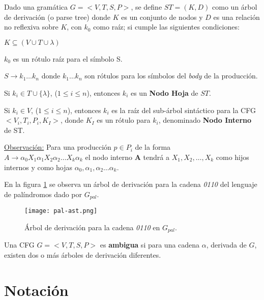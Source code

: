 \begin{definition}
\label{def:arbolderivacion}
Dado una gramática $G = < V,T,S,P>$, se define $ST = (K,D)$ como un árbol de derivación (o parse tree) donde $K$ es un conjunto de nodos y $D$ es una relación no reflexiva sobre $K$, con $k_0$ como raíz; si cumple las siguientes condiciones:

\begin{items}
\item $ K \subseteq (V \cup T \cup \lambda) $
\item $k_{0}$ es un rótulo raíz para el símbolo S.
\item $ S \rightarrow k_{1} \ldots k_{n} $ donde $k_{1} \ldots k_{n}$ son rótulos para los símbolos del \textit{body} de la producción.
\item Si $k_{i} \in T \cup \{\lambda\}$, ($1 \leq i \leq n$), entonces $k_{i}$ es un \textbf{Nodo Hoja} de $ST$. 
\item Si $k_{i} \in V$,  ($1 \leq i \leq n$), entonces $k_{i}$ es la raíz del 
      sub-árbol sintáctico para la CFG $<V_{i},T_{i},P_{i},K_I>$, donde $K_{I}$ es un rótulo para $k_{i}$, denominado \textbf{Nodo Interno} de ST.
\end{items}
\end{definition}

\underline{Observación:} Para una producción $p\in P_{i}$ de la forma\\
$A\rightarrow \alpha_{0}X_{1}\alpha_{1}X_{2}\alpha_{2} \ldots X_{k}\alpha_{k}$ el nodo interno \textbf{A} tendrá a $X_{1}, X_{2},\dots, X_{k}$ como hijos internos y como hojas $\alpha_{0}, \alpha_{1}, \alpha_{2} \ldots \alpha_{k}$.

En la figura \ref{fig:ejePala-st} se observa un árbol de derivación para la cadena \textit{0110} del lenguaje de palíndromos dado por $G_{pal}$.

\begin{figure}[!ht]\centering
\texttt{[image: pal-ast.png]}
\caption{\label{fig:ejePala-st} Árbol de derivación para la cadena \textit{0110} en $G_{pal}$.}
\end{figure}


\begin{definition} Una CFG $G = <V,T,S,P>$ es \textbf{ambigua} si para una cadena $\alpha$, derivada de $G$, existen dos o más árboles de derivación diferentes.
\label{def:ambigua}
\end{definition}

\section{Notación}

